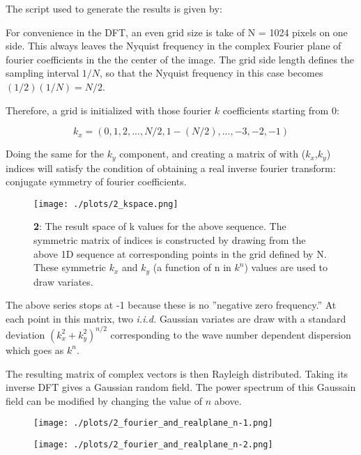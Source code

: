 The script used to generate the results is given by:




For convenience in the DFT, an even grid size is take of N = 1024 pixels on one side. This always leaves the Nyquist frequency in the complex Fourier plane of fourier coefficients in the the center of the image. The grid side length defines the sampling interval $1/N$, so that the Nyquist frequency in this case becomes $(1/2)(1/N) = N/2$.

Therefore, a grid is initialized with those fourier $k$ coefficients starting from 0:

\begin{equation}
    k_x=(0,1,2, ... , N/2, 1- (N/2), ... , -3,-2,-1)
\end{equation}

Doing the same for the $k_y$ component, and creating a matrix of with ($k_x$,$k_y$) indices will satisfy the condition of obtaining a real inverse fourier transform: conjugate symmetry of fourier coefficients.

\begin{figure}[h!]
  \centering
  \texttt{[image: ./plots/2\_kspace.png]}
  \caption{\textbf{2}: The result space of k values for the above sequence. The symmetric matrix of indices is constructed by drawing from the above 1D sequence at corresponding points in the grid defined by N. These symmetric $k_x$ and $k_y$ (a function of n in $k^n$) values are used to draw variates.}
  \label{fig:kspace}
\end{figure}

The above series stops at -1 because these is no ''negative zero frequency.'' At each point in this matrix, two \textit{i.i.d.} Gaussian variates are draw with a standard deviation $(k_x^2+k_y^2)^{n/2}$ corresponding to the wave number dependent dispersion which goes as $k^n$.

The resulting matrix of complex vectors is then Rayleigh distributed. Taking its inverse DFT gives a Gaussian random field. The power spectrum of this Gaussain field can be modified by changing the value of $n$ above.

\begin{figure}[h!]
  \centering
  \texttt{[image: ./plots/2\_fourier\_and\_realplane\_n-1.png]}
  \label{fig:abs}
\end{figure}

\begin{figure}[h!]
  \centering
  \texttt{[image: ./plots/2\_fourier\_and\_realplane\_n-2.png]}
  \label{fig:abs}
\end{figure}

